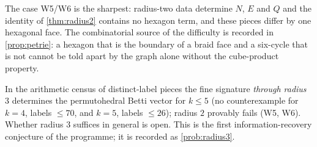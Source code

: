The case W5/W6 is the sharpest: radius-two data determine $N$, $E$ and $Q$ and the identity of \cref{thm:radius2} contains no hexagon term, and these pieces differ by one hexagonal face. The combinatorial source of the difficulty is recorded in \cref{prop:petrie}: a hexagon that is the boundary of a braid face and a six-cycle that is not cannot be told apart by the graph alone without the cube-product property.

\begin{remark}
In the arithmetic census of distinct-label pieces the fine signature \emph{through radius $3$} determines the permutohedral Betti vector for $k\le5$ (no counterexample for $k=4$, labels $\le70$, and $k=5$, labels $\le26$); radius $2$ provably fails (W5, W6). Whether radius $3$ suffices in general is open. This is the first information-recovery conjecture of the programme; it is recorded as \cref{prob:radius3}.
\end{remark}


